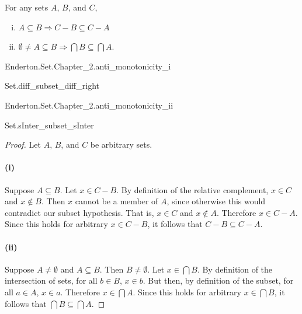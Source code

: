 \documentclass{report}
\begin{document}
  For any sets $A$, $B$, and $C$,
    \begin{enumerate}[(i)]
      \item $A \subseteq B \Rightarrow C - B \subseteq C - A$
      \item $\emptyset \neq A \subseteq B \Rightarrow
        \bigcap B \subseteq \bigcap A$.
    \end{enumerate}

    {Enderton.Set.Chapter\_2.anti\_monotonicity\_i}

    {Set.diff\_subset\_diff\_right}

    {Enderton.Set.Chapter\_2.anti\_monotonicity\_ii}

    {Set.sInter\_subset\_sInter}

  \begin{proof}

    Let $A$, $B$, and $C$ be arbitrary sets.

    \paragraph{(i)}%

      Suppose $A \subseteq B$.
      Let $x \in C - B$.
      By definition of the relative complement, $x \in C$ and $x \not\in B$.
      Then $x$ cannot be a member of $A$, since otherwise this would contradict
        our subset hypothesis.
      That is, $x \in C$ and $x \not\in A$.
      Therefore $x \in C - A$.
      Since this holds for arbitrary $x \in C - B$, it follows that
        $C - B \subseteq C - A$.

    \paragraph{(ii)}%

      Suppose $A \neq \emptyset$ and $A \subseteq B$.
      Then $B \neq \emptyset$.
      Let $x \in \bigcap B$.
      By definition of the intersection of sets, for all $b \in B$, $x \in b$.
      But then, by definition of the subset, for all $a \in A$, $x \in a$.
      Therefore $x \in \bigcap A$.
      Since this holds for arbitrary $x \in \bigcap B$, it follows that
        $\bigcap B \subseteq \bigcap A$.

  \end{proof}

\subsection{}%
\end{document}
